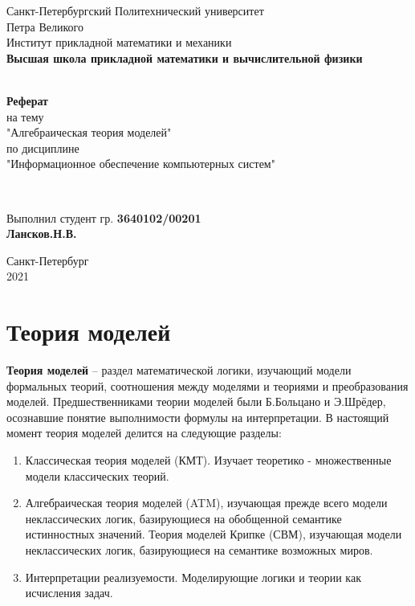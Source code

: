\documentclass[12pt, a4paper]{article}
\begin{document}
\begin{titlepage}
	\center
		Санкт-Петербургский Политехнический
		университет \\ Петра Великого\\
		Институт прикладной математики и механики
		\\ \textbf{Высшая школа прикладной математики и вычислительной физики}

	\vfill ~
	\textbf{
		\\ \large Реферат
	}
	\\	на тему
	\\ "Алгебраическая теория моделей"
	\\ по дисциплине
	\\ "Информационное обеспечение компьютерных систем"

	\vfill ~

	Выполнил студент гр. \textbf{3640102/00201} \\
	\textbf{Лансков.Н.В.} \\

\vfill

{\large}	Санкт-Петербург
\\ 2021
\end{titlepage}

\section{Теория моделей}

\textbf{Теория моделей} – раздел математической логики, изучающий модели формальных теорий,
соотношения между моделями и теориями и преобразования моделей. Предшественниками теории
моделей были Б.Больцано и Э.Шрёдер, осознавшие понятие выполнимости формулы на
интерпретации. В настоящий момент теория моделей делится на следующие разделы: 

\begin{enumerate}
    \item Классическая теория моделей (КМТ). Изучает теоретико - множественные модели классических теорий.
    \item Алгебраическая теория моделей (ATM), изучающая прежде всего модели неклассических логик,
базирующиеся на обобщенной семантике истинностных значений. Теория моделей Крипке (СВМ),
изучающая модели неклассических логик, базирующиеся на семантике возможных миров.
    \item Интерпретации реализуемости. Моделирующие логики и теории как исчисления задач.
\end{enumerate}
\end{document}

